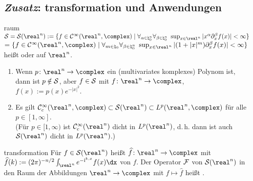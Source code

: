 \pagebreak

\subsection{%
    \emph{Zusatz}: transformation und Anwendungen%
}

\begin{Def}{raum}
    $\S = \S(\real^n) :=
    \{f \in \C^\infty(\real^n, \complex) \;|\;
    \forall_{\alpha\in\natural_0^n} \forall_{\beta\in\natural_0^n}\;
    \sup_{x \in \real^n} |x^\alpha \partial_x^\beta f(x)| < \infty\}$\\
    $= \{f \in \C^\infty(\real^n, \complex) \;|\;
    \forall_{m \in \natural_0} \forall_{\beta \in \natural_0^n}\;
    \sup_{x \in \real^n} |(1 + |x|^m) \partial_x^\beta f(x)| < \infty\}$\\
    heißt  oder
     auf $\real^n$.
\end{Def}

\begin{Bem}
    \begin{enumerate}
        \item
        Wenn $p\colon \real^n \rightarrow \complex$ ein
        (multivariates komplexes) Polynom ist, dann ist $p \notin \S$,
        aber $f \in \S$ mit $f\colon \real^n \rightarrow \complex$, $f(x) := p(x) e^{-|x|^2}$.

        \item
        Es gilt $\C^\infty_c(\real^n, \complex) \subset \S(\real^n) \subset L^p(\real^n, \complex)$
        für alle $p \in [1, \infty]$.\\
        (Für $p \in [1, \infty)$ ist $\C^\infty_c(\real^n)$ dicht in $L^p(\real^n)$,
        d.\,h. dann ist auch $\S(\real^n)$ dicht in $L^p(\real^n)$.)
    \end{enumerate}
\end{Bem}

\linie

\begin{Def}{transformation}
    Für $f \in \S(\real^n)$ heißt $\widehat{f}\colon \real^n \rightarrow \complex$ mit\\
    $\widehat{f}(k) := (2\pi)^{-n/2} \int_{\real^n} e^{-\iu\sp{k,x}} f(x)\dx$
     von $f$.
    Der Operator $\F$ von $\S(\real^n)$ in den Raum der Abbildungen $\real^n \rightarrow \complex$
    mit $f \mapsto \widehat{f}$ heißt .
\end{Def}

